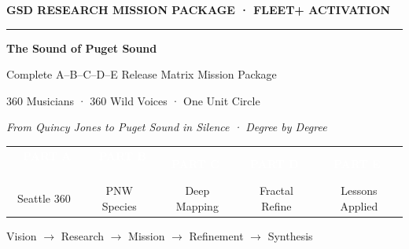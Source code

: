 \documentclass[11pt,letterpaper]{article}
\begin{document}
\thispagestyle{empty}
\begin{center}
\vspace*{1.5cm}

{\small\sffamily\textcolor{primary}{\textbf{GSD RESEARCH MISSION PACKAGE · FLEET+ ACTIVATION}}}

\vspace{0.3cm}
\textcolor{bordergray}{\rule{10cm}{0.4pt}}

\vspace{1cm}
{\fontsize{34}{40}\selectfont\bfseries\sffamily\textcolor{primary}{The Sound of Puget Sound}}

\vspace{0.5cm}
{\fontsize{14}{18}\selectfont\sffamily\textcolor{secondary}{Complete A–B–C–D–E Release Matrix Mission Package}}

\vspace{0.8cm}
{\large\sffamily\textcolor{tertiary}{360 Musicians · 360 Wild Voices · One Unit Circle}}

\vspace{0.3cm}
{\normalsize\sffamily\itshape\textcolor{subtlegray}{From Quincy Jones to Puget Sound in Silence · Degree by Degree}}

\vspace{1.5cm}
\begin{tabular}{ccccc}
\colorbox{colorA}{\textcolor{white}{\sffamily\bfseries\small\  PART A \ }} &
\colorbox{colorB}{\textcolor{white}{\sffamily\bfseries\small\  PART B \ }} &
\colorbox{colorC}{\textcolor{white}{\sffamily\bfseries\small\  PART C \ }} &
\colorbox{colorD}{\textcolor{white}{\sffamily\bfseries\small\  PART D \ }} &
\colorbox{colorE}{\textcolor{white}{\sffamily\bfseries\small\  PART E \ }} \\[4pt]
\sffamily\tiny\textcolor{subtlegray}{Seattle 360} &
\sffamily\tiny\textcolor{subtlegray}{PNW Species} &
\sffamily\tiny\textcolor{subtlegray}{Deep Mapping} &
\sffamily\tiny\textcolor{subtlegray}{Fractal Refine} &
\sffamily\tiny\textcolor{subtlegray}{Lessons Applied} \\
\end{tabular}

\vspace{1.5cm}
{\sffamily\textcolor{accent}{Vision $\rightarrow$ Research $\rightarrow$ Mission $\rightarrow$ Refinement $\rightarrow$ Synthesis}}


\end{center}
\end{document}
